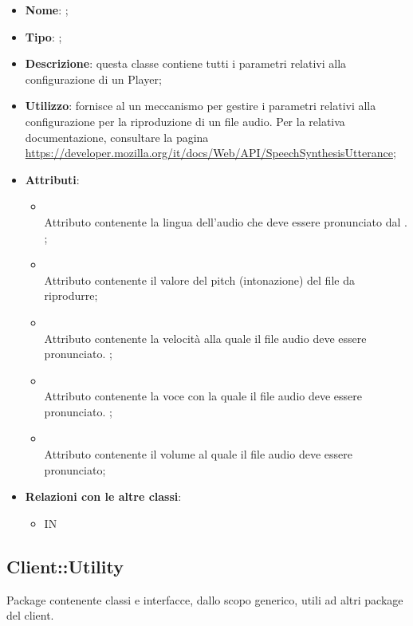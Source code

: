 \begin{itemize}
	\item \textbf{Nome}: ;
	\item \textbf{Tipo}: ;
	\item \textbf{Descrizione}: questa classe contiene tutti i parametri relativi alla configurazione di un Player;
	\item \textbf{Utilizzo}: fornisce al  un meccanismo per gestire i parametri relativi alla configurazione per la riproduzione di un file audio.
Per la relativa documentazione, consultare la pagina \url{https://developer.mozilla.org/it/docs/Web/API/SpeechSynthesisUtterance};
	\item \textbf{Attributi}:
	\begin{itemize}
		\item[]  \\
		Attributo contenente la lingua dell'audio che deve essere pronunciato dal . ;
		\item[]  \\
		Attributo contenente il valore del pitch (intonazione) del file da riprodurre;
		\item[]  \\
		Attributo contenente la velocità alla quale il file audio deve essere pronunciato. ;
		\item[]  \\
		Attributo contenente la voce con la quale il file audio deve essere pronunciato. ;
		\item[]  \\
		Attributo contenente il volume al quale il file audio deve essere pronunciato;
	\end{itemize}
	\item \textbf{Relazioni con le altre classi}:
	\begin{itemize}
		\item IN \hyperlink{Player_label}{}
	\end{itemize}
\end{itemize}
\FloatBarrier

\subsection{Client::Utility}
Package contenente classi e interfacce, dallo scopo generico, utili ad altri package del client.
